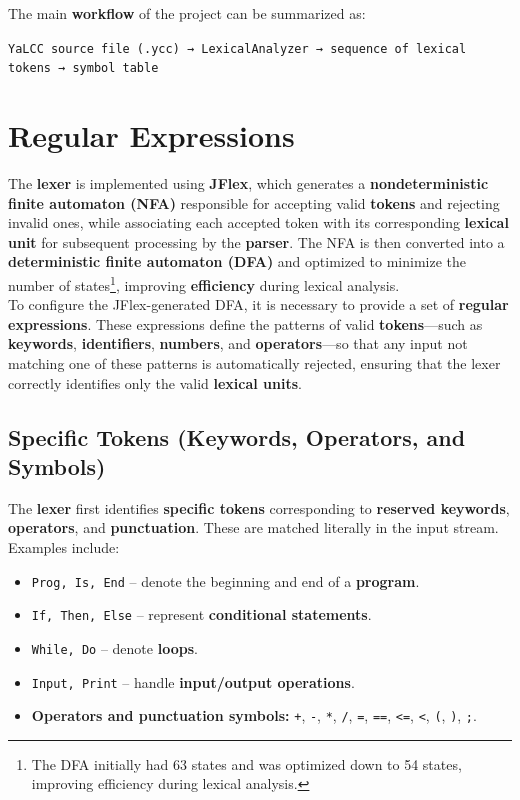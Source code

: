 \documentclass{article}
\begin{document}
\noindent The main \textbf{workflow} of the project can be summarized as: \\[6pt]
\begin{center}
\texttt{YaLCC source file (.ycc) → LexicalAnalyzer → sequence of lexical tokens → symbol table}
\end{center}


\section{Regular Expressions}

\noindent The \textbf{lexer} is implemented using \textbf{JFlex}, which generates a \textbf{nondeterministic finite automaton (NFA)} responsible for accepting valid \textbf{tokens} and rejecting invalid ones, while associating each accepted token with its corresponding \textbf{lexical unit} for subsequent processing by the \textbf{parser}. The NFA is then converted into a \textbf{deterministic finite automaton (DFA)} and optimized to minimize the number of states\footnote{The DFA initially had 63 states and was optimized down to 54 states, improving efficiency during lexical analysis.}, improving \textbf{efficiency} during lexical analysis. \\

\noindent To configure the JFlex-generated DFA, it is necessary to provide a set of \textbf{regular expressions}. These expressions define the patterns of valid \textbf{tokens}—such as \textbf{keywords}, \textbf{identifiers}, \textbf{numbers}, and \textbf{operators}—so that any input not matching one of these patterns is automatically rejected, ensuring that the lexer correctly identifies only the valid \textbf{lexical units}.


\subsection{Specific Tokens (Keywords, Operators, and Symbols)}

\noindent The \textbf{lexer} first identifies \textbf{specific tokens} corresponding to \textbf{reserved keywords}, \textbf{operators}, and \textbf{punctuation}. These are matched literally in the input stream. Examples include:

\begin{itemize}
    \item \texttt{Prog, Is, End} – denote the beginning and end of a \textbf{program}.
    \item \texttt{If, Then, Else} – represent \textbf{conditional statements}.
    \item \texttt{While, Do} – denote \textbf{loops}.
    \item \texttt{Input, Print} – handle \textbf{input/output operations}.
    \item \textbf{Operators and punctuation symbols:} \texttt{+}, \texttt{-}, \texttt{*}, \texttt{/}, \texttt{=}, \texttt{==}, \texttt{<=}, \texttt{<}, \texttt{(}, \texttt{)}, \texttt{;}.
\end{itemize}
\end{document}
